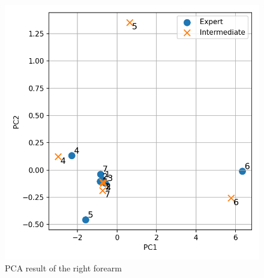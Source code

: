 \documentclass[conference]{IEEEtran}
\begin{document}
%
\begin{figure}[t]
	\centering
	\includegraphics[scale=0.45]{fig/RFArm.pdf}
	\caption{PCA result of the right forearm}
	\label{fig:RFarm}
	\vspace{-0.4cm}
\end{figure}
%
\end{document}
